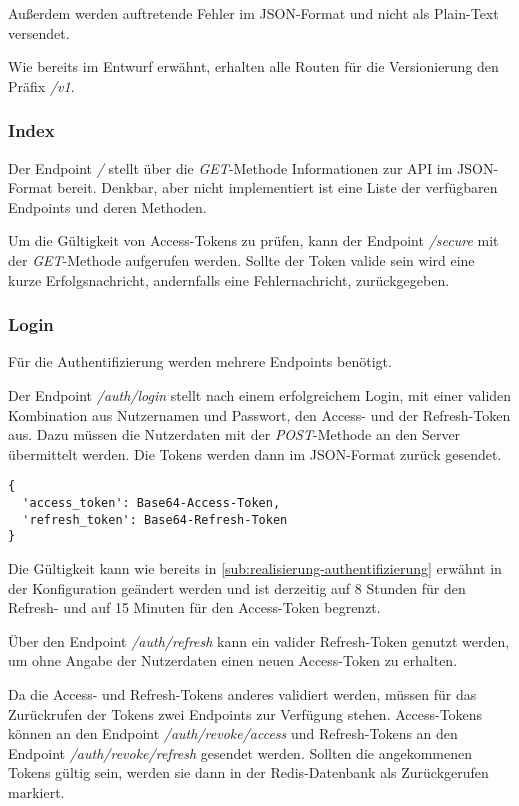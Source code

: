 Außerdem werden auftretende Fehler im JSON-Format und nicht als Plain-Text versendet. 

Wie bereits im Entwurf erwähnt, erhalten alle Routen für die Versionierung den Präfix \textit{/v1}.

\subsubsection{Index}
Der Endpoint \textit{/} stellt über die \textit{GET}-Methode Informationen zur API im JSON-Format bereit. Denkbar, aber nicht implementiert ist eine Liste der verfügbaren Endpoints und deren Methoden.

Um die Gültigkeit von Access-Tokens zu prüfen, kann der Endpoint \textit{/secure} mit der \textit{GET}-Methode aufgerufen werden. Sollte der Token valide sein wird eine kurze Erfolgsnachricht, andernfalls eine Fehlernachricht, zurückgegeben.

\subsubsection{Login}
Für die Authentifizierung werden mehrere Endpoints benötigt.

Der Endpoint \textit{/auth/login} stellt nach einem erfolgreichem Login, mit einer validen Kombination aus Nutzernamen und Passwort, den Access- und der Refresh-Token aus. Dazu müssen die Nutzerdaten mit der \textit{POST}-Methode an den Server übermittelt werden. Die Tokens werden dann im JSON-Format zurück gesendet.

\begin{lstlisting}[frame=single, caption={GIS Access- und Refresh-Token}, captionpos=b, label={lst:gis-login-tokens}]
{
  'access_token': Base64-Access-Token,
  'refresh_token': Base64-Refresh-Token
}

\end{lstlisting}

Die Gültigkeit kann wie bereits in \autoref{sub:realisierung-authentifizierung} erwähnt in der Konfiguration geändert werden und ist derzeitig auf 8 Stunden für den Refresh- und auf 15 Minuten für den Access-Token begrenzt.

Über den Endpoint \textit{/auth/refresh} kann ein valider Refresh-Token genutzt werden, um ohne Angabe der Nutzerdaten einen neuen Access-Token zu erhalten.

Da die Access- und Refresh-Tokens anderes validiert werden, müssen für das Zurückrufen der Tokens zwei Endpoints zur Verfügung stehen. Access-Tokens können an den Endpoint \textit{/auth/revoke/access} und Refresh-Tokens an den Endpoint \textit{/auth/revoke/refresh} gesendet werden. Sollten die angekommenen Tokens gültig sein, werden sie dann in der Redis-Datenbank als Zurückgerufen markiert.

